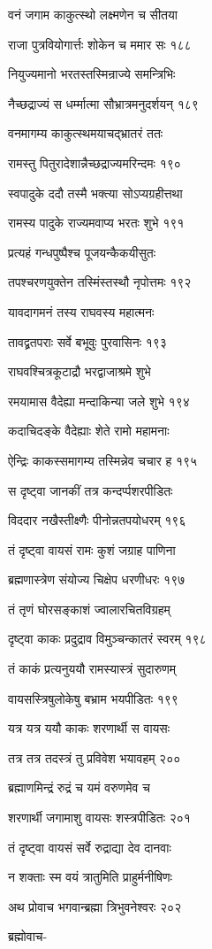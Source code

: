 वनं जगाम काकुत्स्थो लक्ष्मणेन च सीतया

राजा पुत्रवियोगार्त्तः शोकेन च ममार सः १८८

नियुज्यमानो भरतस्तस्मिन्राज्ये समन्त्रिभिः

नैच्छद्राज्यं स धर्म्मात्मा सौभ्रात्रमनुदर्शयन् १८९

वनमागम्य काकुत्स्थमयाचद्भ्रातरं ततः

रामस्तु पितुरादेशान्नैच्छद्राज्यमरिन्दमः १९०

स्वपादुके ददौ तस्मै भक्त्या सोऽप्यग्रहीत्तथा

रामस्य पादुके राज्यमवाप्य भरतः शुभे १९१

प्रत्यहं गन्धपुष्पैश्च पूजयन्कैकयीसुतः

तपश्चरणयुक्तेन तस्मिंस्तस्थौ नृपोत्तमः १९२

यावदागमनं तस्य राघवस्य महात्मनः

तावद्व्रतपराः सर्वे बभूवुः पुरवासिनः १९३

राघवश्चित्रकूटाद्रौ भरद्वाजाश्रमे शुभे

रमयामास वैदेह्या मन्दाकिन्या जले शुभे १९४

कदाचिदङ्के वैदेह्याः शेते रामो महामनाः

ऐन्द्रिः काकस्समागम्य तस्मिन्नेव चचार ह १९५

स दृष्ट्वा जानकीं तत्र कन्दर्प्पशरपीडितः

विददार नखैस्तीक्ष्णैः पीनोन्नतपयोधरम् १९६

तं दृष्ट्वा वायसं रामः कुशं जग्राह पाणिना

ब्रह्मणास्त्रेण संयोज्य चिक्षेप धरणीधरः १९७

तं तृणं घोरसङ्काशं ज्वालारचितविग्रहम्

दृष्ट्वा काकः प्रदुद्राव विमुञ्चन्कातरं स्वरम् १९८

तं काकं प्रत्यनुययौ रामस्यास्त्रं सुदारुणम्

वायसस्त्रिषुलोकेषु बभ्राम भयपीडितः १९९

यत्र यत्र ययौ काकः शरणार्थी स वायसः

तत्र तत्र तदस्त्रं तु प्रविवेश भयावहम् २००

ब्रह्माणमिन्द्रं रुद्रं च यमं वरुणमेव च

शरणार्थी जगामाशु वायसः शस्त्रपीडितः २०१

तं दृष्ट्वा वायसं सर्वे रुद्राद्या देव दानवाः

न शक्ताः स्म वयं त्रातुमिति प्राहुर्मनीषिणः

अथ प्रोवाच भगवान्ब्रह्मा त्रिभुवनेश्वरः २०२

ब्रह्मोवाच-

